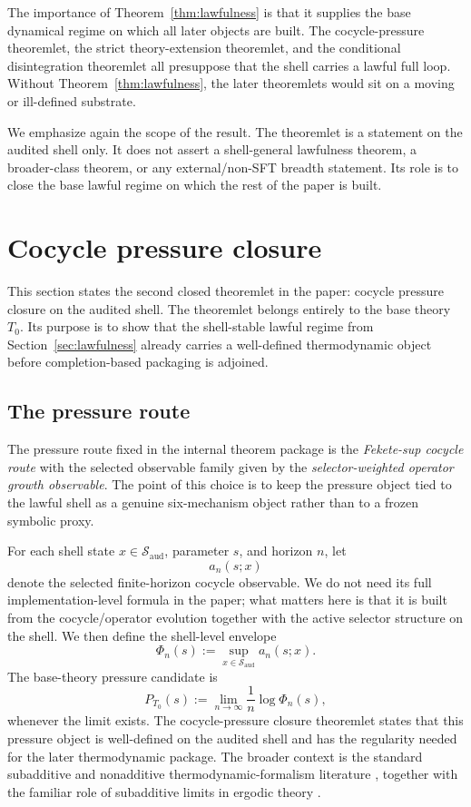 \documentclass[11pt]{article}
\theoremstyle{definition}
\newcommand{\Tzero}{T_0}
\begin{document}
The importance of Theorem~\ref{thm:lawfulness} is that it supplies the base dynamical regime on which all later objects are built. The cocycle-pressure theoremlet, the strict theory-extension theoremlet, and the conditional disintegration theoremlet all presuppose that the shell carries a lawful full loop. Without Theorem~\ref{thm:lawfulness}, the later theoremlets would sit on a moving or ill-defined substrate.

We emphasize again the scope of the result. The theoremlet is a statement on the audited shell only. It does not assert a shell-general lawfulness theorem, a broader-class theorem, or any external/non-SFT breadth statement. Its role is to close the base lawful regime on which the rest of the paper is built.
 \section{Cocycle pressure closure}\label{sec:cocycle-pressure}

This section states the second closed theoremlet in the paper: cocycle pressure closure on the audited shell. The theoremlet belongs entirely to the base theory \(\Tzero\). Its purpose is to show that the shell-stable lawful regime from Section~\ref{sec:lawfulness} already carries a well-defined thermodynamic object before completion-based packaging is adjoined.

\subsection{The pressure route}

The pressure route fixed in the internal theorem package is the \emph{Fekete-sup cocycle route} \cite{Fekete1923DistributionRoots} with the selected observable family given by the \emph{selector-weighted operator growth observable}. The point of this choice is to keep the pressure object tied to the lawful shell as a genuine six-mechanism object rather than to a frozen symbolic proxy.

For each shell state \(x\in\mathcal{S}_{\mathrm{aud}}\), parameter \(s\), and horizon \(n\), let
\[
a_n(s;x)
\]
denote the selected finite-horizon cocycle observable. We do not need its full implementation-level formula in the paper; what matters here is that it is built from the cocycle/operator evolution together with the active selector structure on the shell. We then define the shell-level envelope
\[
\Phi_n(s):=\sup_{x\in\mathcal{S}_{\mathrm{aud}}} a_n(s;x).
\]
The base-theory pressure candidate is
\[
P_{\Tzero}(s):=\lim_{n\to\infty}\frac{1}{n}\log \Phi_n(s),
\]
whenever the limit exists. The cocycle-pressure closure theoremlet states that this pressure object is well-defined on the audited shell and has the regularity needed for the later thermodynamic package. The broader context is the standard subadditive and nonadditive thermodynamic-formalism literature \cite{BarreiraNonadditiveTF,CaoFengHuang2008SubAdditive,Mummert2006AlmostAdditive}, together with the familiar role of subadditive limits in ergodic theory \cite{Kingman1968Subadditive}.
\end{document}
